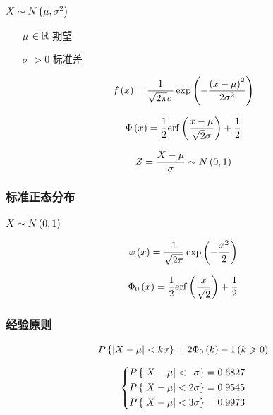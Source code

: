 \documentclass{article}
\begin{document}
$X\sim N\left(\mu,\sigma^2\right)$

\begin{enumerate}
    \item [$\mu$] $\in\mathbb R$ 期望
    \item [$\sigma$] $>0$ 标准差
\end{enumerate}

\[f\left(x\right)=\frac1{\sqrt{2\pi}\sigma}\exp\left(-\frac{{\left(x-\mu\right)}^2}{2\sigma^2}\right)\]

\[\Phi\left(x\right)=\frac12\mathrm{erf}\left(\frac{x-\mu}{\sqrt2\sigma}\right)+\frac12\]

\[Z=\frac{X-\mu}\sigma\sim N\left(0,1\right)\]

\subsubsection{标准正态分布}

$X\sim N\left(0,1\right)$

\begin{center}
\end{center}

\[\varphi\left(x\right)=\frac1{\sqrt{2\pi}}\exp\left(-\frac{x^2}2\right)\]

\[\Phi_0\left(x\right)=\frac12\mathrm{erf}\left(\frac x{\sqrt2}\right)+\frac12\]

\subsubsection{经验原则}

\[P\left\{\left|X-\mu\right|<k\sigma\right\}=2\Phi_0\left(k\right)-1\left(k\geqslant0\right)\]

\[\left\{\begin{aligned}
        P\left\{\left|X-\mu\right|<\enspace\sigma\right\}=0.6827 \\
        P\left\{\left|X-\mu\right|<2\sigma\right\}=0.9545        \\
        P\left\{\left|X-\mu\right|<3\sigma\right\}=0.9973
    \end{aligned}\right.\]
\end{document}

